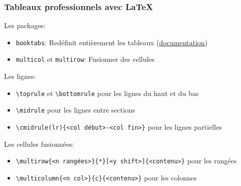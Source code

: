 \documentclass[aspectratio=169]{beamer}
\begin{document}
\begin{frame}[fragile]\frametitle{Tableaux professionnels avec LaTeX}

\vspace{-3mm}

Les packages:
\vspace{-\parskip}
\begin{itemize}
	\item \texttt{booktabs}: Redéfinit entièrement les tableaux (\href{https://ctan.mirror.rafal.ca/info/translations/booktabs/fr/f-booktabs.pdf}{\underline{documentation}})
	\item \texttt{multicol} et \texttt{multirow}: Fusionner des cellules
\end{itemize}

Les lignes:
\vspace{-\parskip}
\begin{itemize}
	\item \verb!\toprule! et \verb!\bottomrule! pour les lignes du haut et du bas
	\item \verb!\midrule! pour les lignes entre sections
	\item \verb!\cmidrule(lr){<col début>-<col fin>}! pour les lignes partielles
\end{itemize}

Les cellules fusionnées:
\vspace{-\parskip}
\begin{itemize}
	\item \verb!\multirow{<n rangées>}{*}[<y shift>]{<contenu>}! pour les rangées
	\item \verb!\multicolumn{<n col>}{c}{<contenu>}! pour les colonnes
\end{itemize}

\end{frame}
\end{document}
